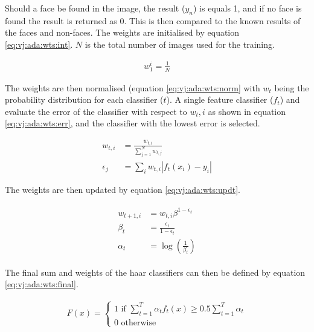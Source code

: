 \documentclass{article}
\begin{document}
Should a face be found in the image, the result ($y_n$) is equals 1, and if no face is found the result is returned as 0.  This is then compared to the known results of the faces and non-faces.  The weights are initialised by equation \ref{eq:vj:ada:wts:int}.  $N$ is the total number of images used for the training.

\begin{align}
    w_{1}^{i}=\frac{1}{N} \label{eq:vj:ada:wts:int}
\end{align}

The weights are then normalised (equation \ref{eq:vj:ada:wts:norm} with $w_t$ being the probability distribution for each classifier ($t$).  A single feature classifier ($f_t$) and evaluate the error of the classifier with respect to $w_t,i$ as shown in equation \ref{eq:vj:ada:wts:err}, and the classifier with the lowest error is selected.  

\begin{align}
    w_{t, i}&=\frac{w_{t, i}}{\sum_{j=1}^{N} w_{t, j}} \label{eq:vj:ada:wts:norm} \\
    \epsilon_{j}&=\sum_{i} w_{t, i}\left|f_{t}\left(x_{i}\right)-y_{i}\right| \label{eq:vj:ada:wts:err}
\end{align}

The weights are then updated by equation \ref{eq:vj:ada:wts:updt}.

\begin{align}
    \begin{split}
        w_{t+1, i}&=w_{t, i} \beta^{1-\epsilon_{t}}\\
        \beta_{t}&=\frac{\epsilon_{t}}{1-\epsilon_{t}}\\
        \alpha_{t}&=\log \left(\frac{1}{\beta_{t}}\right)
    \end{split}  \label{eq:vj:ada:wts:updt}
\end{align}

The final sum and weights of the haar classifiers can then be defined by equation \ref{eq:vj:ada:wts:final}.

\begin{align}
    F(x)=\left\{\begin{array}{c}
    1 \text { if } \sum_{t=1}^{T} \alpha_{t} f_{t}(x) \geq 0.5 \sum_{t=1}^{T} \alpha_{t} \\
    0 \text { otherwise }
    \end{array}\right. \label{eq:vj:ada:wts:final}
\end{align}
\end{document}
